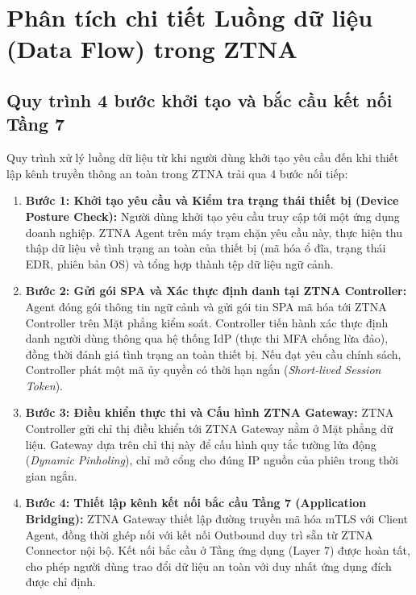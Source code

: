 \section{Phân tích chi tiết Luồng dữ liệu (Data Flow) trong ZTNA}
\label{sec:3_4}

\subsection{Quy trình 4 bước khởi tạo và bắc cầu kết nối Tầng 7}
\label{subsec:3_4_1}

Quy trình xử lý luồng dữ liệu từ khi người dùng khởi tạo yêu cầu đến khi thiết lập kênh truyền thông an toàn trong ZTNA trải qua 4 bước nối tiếp:

\begin{enumerate}
    \item \textbf{Bước 1: Khởi tạo yêu cầu và Kiểm tra trạng thái thiết bị (Device Posture Check):}
    Người dùng khởi tạo yêu cầu truy cập tới một ứng dụng doanh nghiệp. ZTNA Agent trên máy trạm chặn yêu cầu này, thực hiện thu thập dữ liệu về tình trạng an toàn của thiết bị (mã hóa ổ đĩa, trạng thái EDR, phiên bản OS) và tổng hợp thành tệp dữ liệu ngữ cảnh.

    \item \textbf{Bước 2: Gửi gói SPA và Xác thực định danh tại ZTNA Controller:}
    Agent đóng gói thông tin ngữ cảnh và gửi gói tin SPA mã hóa tới ZTNA Controller trên Mặt phẳng kiểm soát. Controller tiến hành xác thực định danh người dùng thông qua hệ thống IdP (thực thi MFA chống lừa đảo), đồng thời đánh giá tình trạng an toàn thiết bị. Nếu đạt yêu cầu chính sách, Controller phát một mã ủy quyền có thời hạn ngắn (\textit{Short-lived Session Token}).

    \item \textbf{Bước 3: Điều khiển thực thi và Cấu hình ZTNA Gateway:}
    ZTNA Controller gửi chỉ thị điều khiển tới ZTNA Gateway nằm ở Mặt phẳng dữ liệu. Gateway dựa trên chỉ thị này để cấu hình quy tắc tường lửa động (\textit{Dynamic Pinholing}), chỉ mở cổng cho đúng IP nguồn của phiên trong thời gian ngắn.

    \item \textbf{Bước 4: Thiết lập kênh kết nối bắc cầu Tầng 7 (Application Bridging):}
    ZTNA Gateway thiết lập đường truyền mã hóa mTLS với Client Agent, đồng thời ghép nối với kết nối Outbound duy trì sẵn từ ZTNA Connector nội bộ. Kết nối bắc cầu ở Tầng ứng dụng (Layer 7) được hoàn tất, cho phép người dùng trao đổi dữ liệu an toàn với duy nhất ứng dụng đích được chỉ định.
\end{enumerate}

